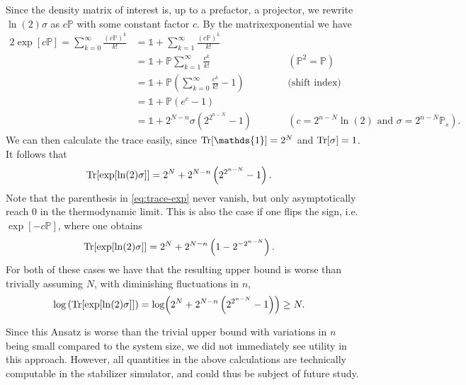 Since the density matrix of interest is, up to a prefactor, a projector, we
rewrite $\ln(2)\sigma$ as $c\mathbb{P}$ with some constant factor $c$.
By the matrixexponential we have
\begin{alignat*}{2}
  \exp[c\mathbb{P}] 
    = \sum_{k=0}^\infty \frac{\left(c\mathbb{P}\right)^k}{k!}
    &= \mathds{1} + \sum_{k=1}^\infty \frac{\left(c\mathbb{P}\right)^k}{k!}\\
    &= \mathds{1} + \mathbb{P}\sum_{k=1}^\infty \frac{c^k}{k!}
    &&\qquad{(\mathbb{P}^2 = \mathbb{P})}\\
    &= \mathds{1} + \mathbb{P}\left(\sum_{k=0}^\infty \frac{c^k}{k!} - 1\right)
    &&\qquad{\text{(shift index)}}\\
    &= \mathds{1} + \mathbb{P}\left(e^c -1\right) \\
    &= \mathds{1} + 2^{N-n}\sigma\left(2^{2^{n-N}}-1 \right) &&\qquad{(c =
      2^{n-N}\ln(2) \text{ and } \sigma = 2^{n-N}\mathbb{P}_s)}
.\end{alignat*}
We can then calculate the trace easily, since $\Tr[\mathds{1}] = 2^N$
and $\Tr[\sigma] = 1$. It follows that
\begin{align}
  \Tr[\exp[\ln(2)\sigma]] &= 2^N + 2^{N-n}\left(2^{2^{n-N}} -1 \right)
  \label{eq:trace-exp}
.\end{align}
Note that the parenthesis in \cref{eq:trace-exp} never vanish, but only
asymptotically reach $0$ in the thermodynamic limit. This is also the case if
one flips the sign, i.e. $\exp[-c\mathbb{P}]$, where one obtains
\begin{align}
  \Tr[\exp[\ln(2)\sigma]] &= 2^N + 2^{N-n}\left(1-2^{-2^{n-N}}\right)
.\end{align}
For both of these cases we have that the resulting upper bound is worse than
trivially assuming $N$, with diminishing fluctuations in $n$,
\begin{align}
  \log\left(\Tr[\exp[\ln(2)\sigma]]\right) &= \log(2^N +
  2^{N-n}\left(2^{2^{n-N}} -1 \right)) \geq N
.\end{align}

Since this Ansatz is worse than the trivial upper bound with variations in $n$
being small compared to the system size, we did not immediately see utility in
this approach. However, all quantities in the above calculations are
technically computable in the stabilizer simulator, and could thus be subject
of future study. 

